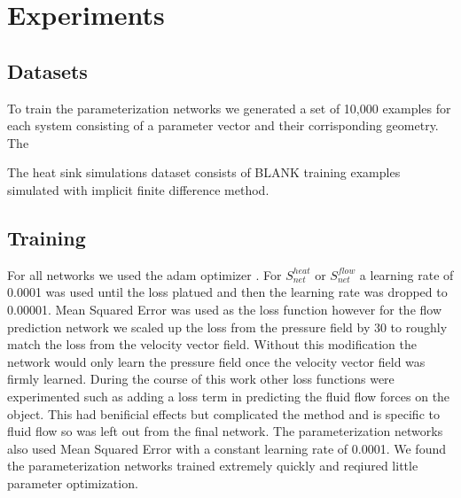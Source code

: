 \documentclass{article} %
\begin{document}
\section{Experiments}


\subsection{Datasets}

To train the parameterization networks we generated a set of 10,000 examples for each system consisting of a parameter vector and their corrisponding geometry. The 

The heat sink simulations dataset consists of BLANK training examples simulated with implicit finite difference method.

\subsection{Training}

For all networks we used the adam optimizer \cite{kingma2014adam}. For $S^{heat}_{net}$ or $S^{flow}_{net}$ a learning rate of 0.0001 was used until the loss platued and then the learning rate was dropped to 0.00001. Mean Squared Error was used as the loss function however for the flow prediction network we scaled up the loss from the pressure field by 30 to roughly match the loss from the velocity vector field. Without this modification the network would only learn the pressure field once the velocity vector field was firmly learned. During the course of this work other loss functions were experimented such as adding a loss term in predicting the fluid flow forces on the object. This had benificial effects but complicated the method and is specific to fluid flow so was left out from the final network. The parameterization networks also used Mean Squared Error with a constant learning rate of 0.0001. We found the parameterization networks trained extremely quickly and reqiured little parameter optimization.
\end{document}
